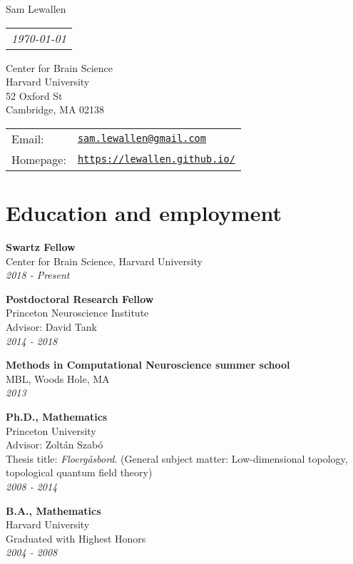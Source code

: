 \documentclass[letterpaper]{article}
\makeatletter
\def\name{Sam Lewallen}
\def\email{sam.lewallen@gmail.com}
\def\url{https://lewallen.github.io/}
\def\address{
Center for Brain Science \\
Harvard University \\
52 Oxford St \\
Cambridge, MA 02138  
}
\def\lsk{\\[.15em]}
\renewenvironment{itemize}{
  \begin{list}{}{
    \setlength{\leftmargin}{1.5em}
  }
}{
  \end{list}
}
\makeatother
\begin{document}
{\huge \name}
\hfill%
\begin{tabular}[t]{l@{}}
\textit{\today}
\end{tabular}
\vspace{0.4in}

\begin{minipage}{0.45\linewidth}
\address
\end{minipage}
\begin{minipage}{0.45\linewidth}
  \begin{tabular}{ll}
    Email: & \href{mailto:\email}{\tt \email} \\
    Homepage: & \href{\url}{\tt \url} \\
  \end{tabular}
\end{minipage}

\section*{Education and employment}
\begin{itemize}
\item \textbf{Swartz Fellow} \lsk
Center for Brain Science, Harvard University \lsk
\textit{2018 - Present} \\

\item \textbf{Postdoctoral Research Fellow} \lsk
Princeton Neuroscience Institute \lsk
Advisor: David Tank \lsk
\textit{2014 - 2018} \\

\item \textbf{Methods in Computational Neuroscience summer school} \lsk
MBL, Woods Hole, MA \lsk
\textit{2013} \\

\item \textbf{Ph.D., Mathematics} \lsk
Princeton University \lsk
Advisor: Zolt\'{a}n Szab\'{o} \lsk
Thesis title: \textit{Floerg\aa sbord}. (General subject matter: Low-dimensional topology, topological quantum field theory) \lsk
\textit{2008 - 2014} \\
\item \textbf{B.A., Mathematics} \lsk
Harvard University \lsk
Graduated with Highest Honors \lsk
\textit{2004 - 2008}
  \end{itemize}
\end{document}
